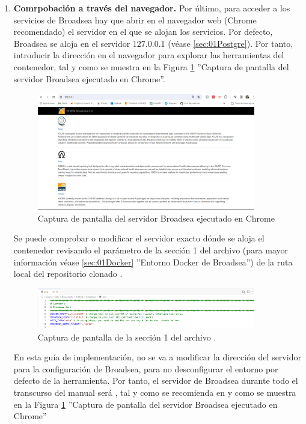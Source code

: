 \begin{enumerate}[label=\alph*]
    \item \textbf{Comrpobación a través del navegador.} Por último, para acceder a los servicios de Broadsea hay que abrir en el navegador web (Chrome recomendado) el servidor en el que se alojan los servicios. Por defecto, Broadsea se aloja en el servidor 127.0.0.1 (véase \ref{sec:01Postgre}).  Por tanto, introducir la dirección en el navegador para explorar las herramientas del contenedor, tal y como se muestra en la Figura \ref{fig:broadseaCap} ''Captura de pantalla del servidor Broadsea ejecutado en Chrome''.

    \begin{figure}[H]
    \centering
    \includegraphics[width=0.90\textwidth]{figures/broadseaCap.png}
     \caption{Captura de pantalla del servidor Broadsea ejecutado en Chrome}
    \label{fig:broadseaCap}
\end{figure}
    
    Se puede comprobar o modificar el servidor exacto dónde se aloja el contenedor revisando el parámetro  de la sección 1 del archivo  (para mayor información véase \ref{sec:01Docker} ''Entorno Docker de Broadsea'') de la ruta local del repositorio clonado . 

\begin{figure}[H]
    \centering
    \includegraphics[width=0.90\textwidth]{figures/seccion1env.png}
    \caption{Captura de pantalla de la sección 1 del archivo .}
    \label{fig:seccion1env}    
\end{figure}

    En esta guía de implementación, no se va a modificar la dirección del servidor para la configuración de Broadsea, para no desconfigurar el entorno por defecto de la herramienta. Por tanto, el servidor de Broadsea durante todo el transcurso del manual será , tal y como se recomienda en \parencite{githubBroadseaDB} y como se muestra en la Figura \ref{fig:broadseaCap} ''Captura de pantalla del servidor Broadsea ejecutado en Chrome''

\end{enumerate}

